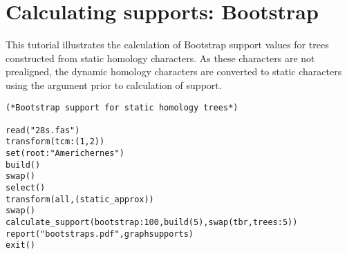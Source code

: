 
\section{Calculating supports: Bootstrap}{\label{tutorial6}}

This tutorial illustrates the calculation of Bootstrap support values for trees constructed from static homology characters. 
As these characters are not prealigned, the dynamic homology characters are converted to static 
characters using the argument  prior to calculation of support.

\begin{verbatim}
(*Bootstrap support for static homology trees*)

read("28s.fas")
transform(tcm:(1,2))
set(root:"Americhernes")
build()
swap()
select()
transform(all,(static_approx))
swap()
calculate_support(bootstrap:100,build(5),swap(tbr,trees:5))
report("bootstraps.pdf",graphsupports)
exit()
\end{verbatim}

